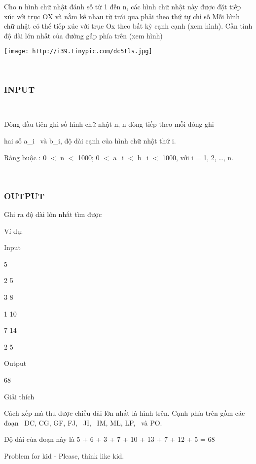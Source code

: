 

Cho n hình chữ nhật đánh số từ 1 đến n, các hình chữ nhật này được đặt tiếp xúc với trục OX và nằm kề nhau từ trái qua phải theo thứ tự chỉ số Mỗi hình chữ nhật có thể tiếp xúc với trục Ox theo bất kỳ cạnh cạnh (xem hình). Cần tính độ dài lớn nhất của đường gấp phía trên (xem hình)

\href{http://tinypic.com}{
\texttt{[image: http://i39.tinypic.com/dc5tls.jpg]}}

 

\subsubsection{INPUT}

 

Dòng đầu tiên ghi số hình chữ nhật n, n dòng tiếp theo mỗi dòng ghi


hai số a\_i  và b\_i, độ dài cạnh của hình chữ nhật thứ i.


Ràng buộc : 0 $<$ n $<$ 1000; 0 $<$ a\_i $<$ b\_i $<$ 1000, với i = 1, 2, …, n. 

 

\subsubsection{OUTPUT}

Ghi ra độ dài lớn nhất tìm được





​Ví dụ:

Input

5 


2 5 


3 8 


1 10 


7 14 


2 5

Output 

68

Giải thích

Cách xếp mà thu được chiều dài lớn nhất là hình trên. Cạnh phía trên gồm các đoạn  DC, CG, GF, FJ,  JI,  IM, ML, LP,  và PO.

Độ dài của đoạn này là 5 + 6 + 3 + 7 + 10 + 13 + 7 + 12 + 5 = 68

Problem for kid - Please, think like kid.
